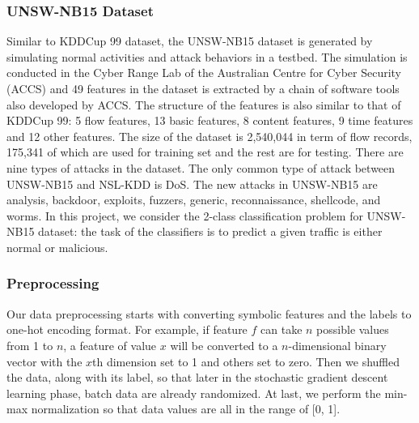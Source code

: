 \subsubsection{UNSW-NB15 Dataset}
Similar to KDDCup 99 dataset, the UNSW-NB15 dataset is generated by simulating normal
activities and attack behaviors in a testbed.
The simulation is conducted in the Cyber Range Lab of the Australian Centre for Cyber Security (ACCS)
and 49 features in the dataset is extracted by a chain of software tools also developed by ACCS.
The structure of the features is also similar to that of KDDCup 99: 5 flow features,
13 basic features, 8 content features, 9 time features and 12 other features.
The size of the dataset is 2,540,044 in term of flow records, 175,341 of which are used for
training set and the rest are for testing.
There are nine types of attacks in the dataset.
The only common type of attack between UNSW-NB15 and NSL-KDD is DoS.
The new attacks in UNSW-NB15 are analysis, backdoor, exploits, fuzzers, generic, reconnaissance, shellcode, and worms.
In this project, we consider the 2-class classification problem for UNSW-NB15 dataset: the
task of the classifiers is to predict a given traffic is either normal or malicious.

\subsubsection{Preprocessing}
Our data preprocessing starts with converting symbolic features and the labels 
to one-hot encoding format.
For example, if feature $f$ can take $n$ possible values from 1 to $n$,
a feature of value $x$ will be converted to a $n$-dimensional binary vector with the $x$th
dimension set to 1 and others set to zero.
Then we shuffled the data, along with its label, so that later in the stochastic
gradient descent learning phase, batch data are already randomized.
At last, we perform the min-max normalization so that data values are all in the range
of [0, 1].



